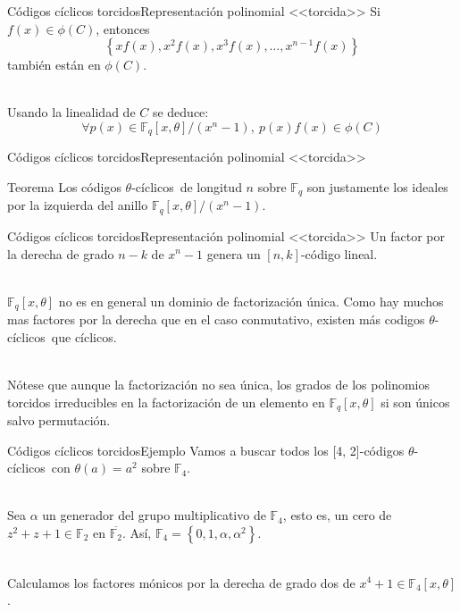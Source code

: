 \documentclass[aspectratio=43,14pt,spanish]{beamer}
\newcommand{\Fq}{\mathbb{F}_q}
\newcommand{\Fqxo}{\Fq[x, \theta]}
\newcommand{\Fxx}{\Fq[x, \theta]/(x^n - 1)}
\newcommand{\tcs}{$\theta$-cíclicos\ }
\theoremstyle{definition} %
\begin{document}
    \begin{frame}{Códigos cíclicos torcidos}{Representación polinomial <<torcida>>}
        Si $f(x) \in \phi(C)$, entonces $$\left\{x f(x), x^2 f(x), x^3 f(x), \dots, x^{n-1} f(x)\right\}$$ también están en $\phi(C)$.

        \ \\

        Usando la linealidad de $C$ se deduce: $$\forall p(x) \in \Fxx,\ p(x) f(x) \in \phi(C)$$
    \end{frame}


    \begin{frame}{Códigos cíclicos torcidos}{Representación polinomial <<torcida>>}
        \begin{alertblock}{Teorema}
            Los códigos \tcs de longitud $n$ sobre $\Fq$ son justamente los ideales por la izquierda del anillo $\Fxx$.
        \end{alertblock}
    \end{frame}

    \begin{frame}{Códigos cíclicos torcidos}{Representación polinomial <<torcida>>}
        Un factor por la derecha de grado $n - k$ de $x^n - 1$ genera un $[n, k]$-código lineal.

        \ \\

        $\Fqxo$ no es en general un dominio de factorización única. Como hay muchos mas factores por la derecha que en el caso conmutativo, existen más codigos \tcs que cíclicos.

        \ \\

        Nótese que aunque la factorización no sea única, los grados de los polinomios torcidos irreducibles en la factorización de un elemento en $\Fqxo$ si son únicos salvo permutación.

    \end{frame}

    \begin{frame}{Códigos cíclicos torcidos}{Ejemplo}
        Vamos a buscar todos los [4, 2]-códigos \tcs con $\theta(a) = a^2$ sobre $\mathbb{F}_4$.

        \ \\

        Sea $\alpha$ un generador del grupo multiplicativo de $\mathbb{F}_4$, esto es, un cero de $z^2 + z + 1 \in \mathbb{F}_2$ en $\overline{\mathbb{F}_2}$. Así, $\mathbb{F}_4 = \left\{0, 1, \alpha, \alpha^2 \right\}$.

        \ \\

        Calculamos los factores mónicos por la derecha de grado dos de $x^4 + 1 \in \mathbb{F}_4[x, \theta]$.

    \end{frame}
\end{document}
